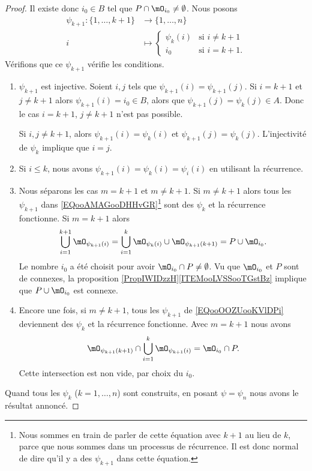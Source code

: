 \begin{proof}
    Il existe donc \( i_0\in B\) tel que \( P\cap\mO_{i_0}\neq \emptyset\). Nous posons
    \begin{equation}
        \begin{aligned}
            \psi_{k+1}\colon \{ 1,\ldots, k+1 \}&\to \{ 1,\ldots, n \} \\
            i&\mapsto \begin{cases}
                \psi_k(i)    &   \text{si } i\neq k+1\\
                 i_0   &    \text{si } i=k+1.
            \end{cases}
        \end{aligned}
    \end{equation}
    Vérifions que ce \( \psi_{k+1}\) vérifie les conditions.
    \begin{enumerate}
        \item
            \( \psi_{k+1}\) est injective. Soient \( i,j\) tels que \( \psi_{k+1}(i)=\psi_{k+1}(j)\). Si \( i=k+1\) et \( j\neq k+1\) alors \( \psi_{k+1}(i)=i_0\in B\), alors que \( \psi_{k+1}(j)=\psi_k(j)\in A\). Donc le cas \( i=k+1\), \( j\neq k+1\) n'est pas possible.

            Si \( i,j\neq k+1\), alors \( \psi_{k+1}(i)=\psi_k(i)\) et \( \psi_{k+1}(j)=\psi_k(j)\). L'injectivité de \( \psi_k\) implique que \( i=j\).
        \item
            Si \( i\leq k\), nous avons \( \psi_{k+1}(i)=\psi_k(i)=\psi_i(i)\) en utilisant la récurrence.
        \item
            Nous séparons les cas \( m=k+1\) et \( m\neq k+1\). Si \( m\neq k+1\) alors tous les \( \psi_{k+1}\) dans \eqref{EQooAMAGooDHHvGR}\footnote{Nous sommes en train de parler de cette équation avec \( k+1\) au lieu de \( k\), parce que nous sommes dans un processus de récurrence. Il est donc normal de dire qu'il y a des \( \psi_{k+1}\) dans cette équation.} sont des \( \psi_k\) et la récurrence fonctionne. Si \( m=k+1\) alors
            \begin{equation}
                \bigcup_{i=1}^{k+1}\mO_{\psi_{k+1}(i)}=\bigcup_{i=1}^k\mO_{\psi_k(i)}\cup\mO_{\psi_{k+1}(k+1)}=P\cup\mO_{i_0}.
            \end{equation}
            Le nombre \( i_0\) a été choisit pour avoir \( \mO_{i_0}\cap P\neq \emptyset\). Vu que \( \mO_{i_0} \) et \( P\) sont de connexes, la proposition \ref{PropIWIDzzH}\ref{ITEMooLVSSooTGstBz} implique que \( P\cup\mO_{i_0}\) est connexe.
        \item
            Encore une fois, si \( m\neq k+1\), tous les \( \psi_{k+1}\) de \eqref{EQooOOZUooKVlDPi} deviennent des \( \psi_k\) et la récurrence fonctionne. Avec \( m=k+1\) nous avons
            \begin{equation}
                \mO_{\psi_{k+1}(k+1)}\cap\bigcup_{i=1}^k\mO_{\psi_{k+1}(i)}=\mO_{i_0}\cap P.
            \end{equation}
            Cette intersection est non vide, par choix du \( i_0\).
    \end{enumerate}
    Quand tous les \( \psi_k\) (\( k=1,\ldots, n\)) sont construits, en posant \( \psi=\psi_n\) nous avons le résultat annoncé.
\end{proof}

